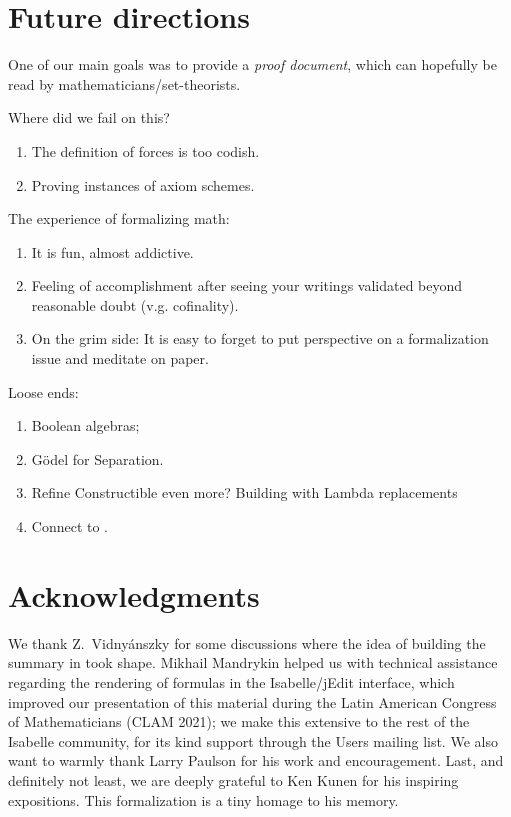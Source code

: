 \section{Future directions}
\label{sec:conclusion}

One of our main goals was to provide a \emph{proof document}, which
can hopefully be read by mathematicians/set-theorists.

Where did we fail on this?
\begin{enumerate}
\item
  The definition of forces is too codish.
\item
  Proving instances of axiom schemes.
\end{enumerate}

The experience of formalizing math:
\begin{enumerate}
\item It is fun, almost addictive.
\item Feeling of accomplishment after seeing your writings
  validated beyond reasonable doubt (v.g. cofinality).
\item On the grim side: It is easy to forget to put perspective on a
  formalization issue and meditate on paper.
\end{enumerate}

Loose ends:
\begin{enumerate}
\item
  Boolean algebras;
\item
  Gödel for Separation.
\item
  Refine Constructible even more? Building with Lambda replacements
\item
  Connect to .
\end{enumerate}

\section*{Acknowledgments}
\label{sec:acknowledgments}
We thank Z.~Vidnyánszky for some discussions where the idea of
building the summary in  took shape.
Mikhail Mandrykin helped us with technical assistance regarding the
rendering of formulas in the Isabelle/jEdit interface, which improved
our presentation of this material during the Latin American Congress
of Mathematicians (CLAM 2021); we make this extensive to the rest of
the Isabelle community, for its kind support through the Users mailing
list. We also want to warmly thank Larry Paulson for his work and
encouragement.  Last, and definitely not least, we are deeply grateful
to Ken Kunen for his
inspiring expositions. This formalization is a tiny homage to his
memory.


